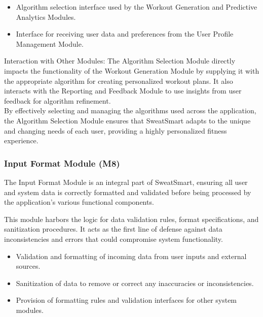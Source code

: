 \documentclass[12pt, titlepage]{article}
\begin{document}
\begin{description}[leftmargin=0pt]
\item[Interfaces:]
\end{description}
\begin{itemize}[leftmargin=*]
\item Algorithm selection interface used by the Workout Generation and Predictive Analytics Modules.
\item Interface for receiving user data and preferences from the User Profile Management Module.
\end{itemize}

Interaction with Other Modules: The Algorithm Selection Module directly impacts the functionality of the Workout Generation Module by supplying it with the appropriate algorithm for creating personalized workout plans. It also interacts with the Reporting and Feedback Module to use insights from user feedback for algorithm refinement.
\\

By effectively selecting and managing the algorithms used across the application, the Algorithm Selection Module ensures that SweatSmart adapts to the unique and changing needs of each user, providing a highly personalized fitness experience.

\subsubsection{Input Format Module (M8)}

The Input Format Module is an integral part of SweatSmart, ensuring all user and system data is correctly formatted and validated before being processed by the application's various functional components.

\begin{description}[leftmargin=0pt]
\item[Secrets:]
This module harbors the logic for data validation rules, format specifications, and sanitization procedures. It acts as the first line of defense against data inconsistencies and errors that could compromise system functionality.
\end{description}

\begin{description}[leftmargin=0pt]
\item[Services:]
\end{description}
\begin{itemize}[leftmargin=*]
\item Validation and formatting of incoming data from user inputs and external sources.
\item Sanitization of data to remove or correct any inaccuracies or inconsistencies.
\item Provision of formatting rules and validation interfaces for other system modules.
\end{itemize}
\end{document}
